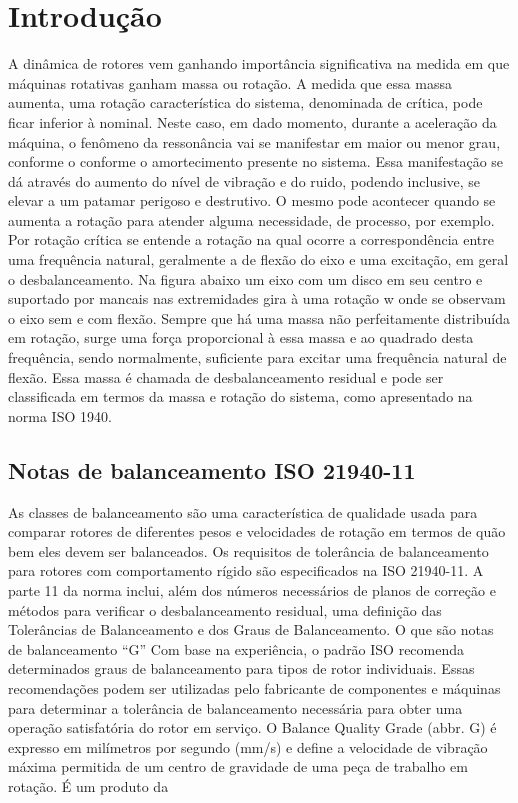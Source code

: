 \documentclass[a4paper]{book}
\begin{document}
\chapter{Introdução}
A dinâmica de rotores vem ganhando importância significativa na medida em que máquinas rotativas ganham massa ou rotação. A medida que essa massa aumenta, uma rotação característica do sistema, denominada de crítica, pode ficar inferior à nominal. Neste caso, em dado momento, durante a aceleração da máquina, o fenômeno da ressonância vai se manifestar em maior ou menor grau, conforme o conforme o amortecimento presente no sistema. Essa manifestação se dá através do aumento do nível de vibração e do ruido, podendo inclusive, se elevar a um patamar perigoso e destrutivo. O mesmo pode acontecer quando se aumenta a rotação para atender alguma necessidade, de processo, por exemplo.
Por rotação crítica se entende a rotação na qual ocorre a correspondência entre uma frequência natural, geralmente a de flexão do eixo e uma excitação, em geral o desbalanceamento.
Na figura abaixo um eixo com um disco em seu centro e suportado por mancais nas extremidades gira à uma rotação w onde se observam o eixo sem e com flexão.
Sempre que há uma massa não perfeitamente distribuída em rotação, surge uma força proporcional à essa massa e ao quadrado desta frequência, sendo normalmente, suficiente para excitar uma frequência natural de flexão. Essa massa é chamada de desbalanceamento residual e pode ser classificada em termos da massa e rotação do sistema, como apresentado na norma ISO 1940.


\section{Notas de balanceamento ISO 21940-11}
As classes de balanceamento são uma característica de qualidade usada para comparar rotores de diferentes pesos e velocidades de rotação em termos de quão bem eles devem ser balanceados.
Os requisitos de tolerância de balanceamento para rotores com comportamento rígido são especificados na ISO 21940-11. A parte 11 da norma inclui, além dos números necessários de planos de correção e métodos para verificar o desbalanceamento residual, uma definição das Tolerâncias de Balanceamento e dos Graus de Balanceamento.
O que são notas de balanceamento “G”
Com base na experiência, o padrão ISO recomenda determinados graus de balanceamento para tipos de rotor individuais. Essas recomendações podem ser utilizadas pelo fabricante de componentes e máquinas para determinar a tolerância de balanceamento necessária para obter uma operação satisfatória do rotor em serviço.
O Balance Quality Grade (abbr. G) é expresso em milímetros por segundo (mm/s) e define a velocidade de vibração máxima permitida de um centro de gravidade de uma peça de trabalho em rotação. É um produto da
\end{document}
